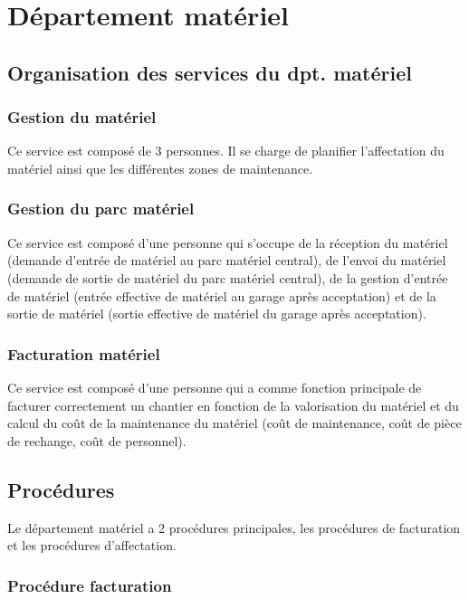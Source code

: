 \section{Département matériel}

\subsection{Organisation des services du dpt. matériel}


	\subsubsection{Gestion du matériel}

	Ce service est composé de 3 personnes. Il se charge de planifier
    l'affectation du matériel ainsi que les différentes zones de
    maintenance.
	
	\subsubsection{Gestion du parc matériel}
	
    Ce service est composé d'une personne qui s'occupe de la réception
    du matériel (demande d'entrée de matériel au parc matériel central),
    de l'envoi du matériel (demande de sortie de matériel du parc matériel
    central), de la gestion d'entrée de matériel (entrée effective de
    matériel au garage après acceptation) et de la sortie de matériel
    (sortie effective de matériel du garage après acceptation).
		
	\subsubsection{Facturation matériel}
	
    Ce service est composé d'une personne qui a comme fonction principale de
    facturer correctement un chantier en fonction de la valorisation du
    matériel et du calcul du coût de la maintenance du matériel (coût de 
    maintenance, coût de pièce de rechange, coût de personnel).
	
\subsection{Procédures}
	
    Le département matériel a 2 procédures principales, les procédures de
    facturation et les procédures d'affectation.

\subsubsection{Procédure facturation}


